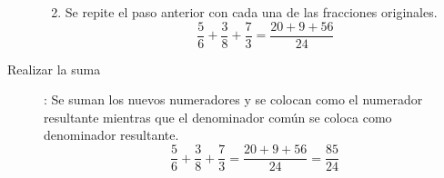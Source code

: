 \begin{description}
\begin{enumerate}
\begin{equation*}
\end{equation*}
\item Se repite el paso anterior con cada una de las fracciones originales.
\begin{equation*}
\dfrac{5}{6}+\dfrac{3}{8}+\dfrac{7}{3}=\dfrac{20+9+56}{24}
\end{equation*}
\end{enumerate}
\item[Realizar la suma]: Se suman los nuevos numeradores y se colocan como el numerador resultante mientras que el denominador común se coloca como denominador resultante.
\begin{equation*}
\dfrac{5}{6}+\dfrac{3}{8}+\dfrac{7}{3}=\dfrac{20+9+56}{24}=\dfrac{85}{24}
\end{equation*}
\end{description}

